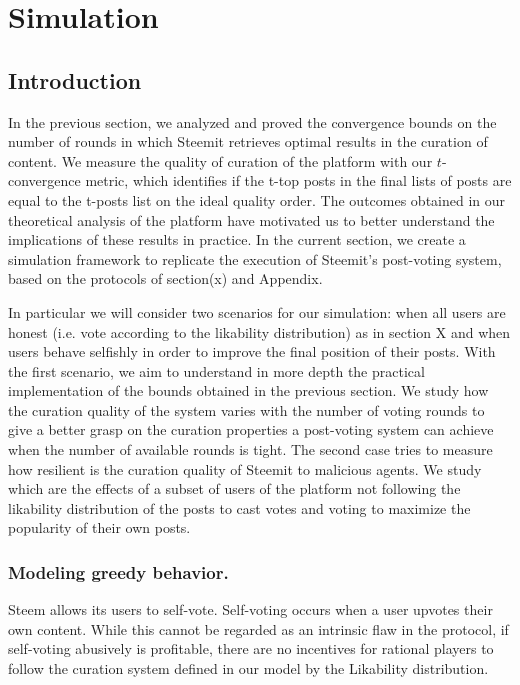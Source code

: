 \section{Simulation}
  \subsection{Introduction}
    In the previous section, we analyzed and proved the convergence bounds on
    the number of rounds in which Steemit retrieves optimal results in the
    curation of content. We measure the quality of curation of the platform with
    our $t$-convergence metric, which identifies if the t-top posts in
    the final lists of posts are equal to the t-posts list on the ideal quality
    order. The outcomes obtained in our theoretical analysis of the platform
    have motivated us to better understand the implications of these results in
    practice. In the current section, we create a simulation framework to
    replicate the execution of Steemit's post-voting system, based on the
    protocols of section(x) and Appendix.

    In particular we will consider two scenarios for our simulation: when all
    users are honest (i.e. vote according to the likability distribution) as in
    section X and when users behave selfishly in order to improve the final
    position of their posts. With the first scenario, we aim to understand in
    more depth the practical implementation of the bounds obtained in the
    previous section. We study how the curation quality of the system varies
    with the number of voting rounds to give a better grasp on the curation
    properties a post-voting system can achieve when the number of available
    rounds is tight. The second case tries to measure how resilient is the
    curation quality of Steemit to malicious agents. We study which are the
    effects of a subset of users of the platform not following the likability
    distribution of the posts to cast votes and voting to maximize the
    popularity of their own posts.

    \subsubsection*{Modeling greedy behavior.}
      Steem allows its users to self-vote. Self-voting occurs when a user
      upvotes their own content. While this cannot be regarded as an intrinsic
      flaw in the protocol, if self-voting abusively is profitable, there are no
      incentives for rational players to follow the curation system defined in
      our model by the Likability distribution.


